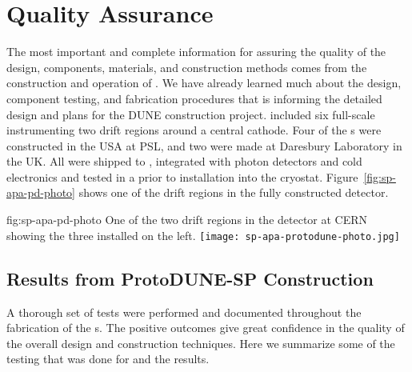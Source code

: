 \section{Quality Assurance}
\label{sec:fdsp-apa-qa}



The most important and complete information for assuring the quality of the  design, components, materials, and construction methods comes from the construction and operation of .  We have already learned much about the design, component testing, and fabrication procedures that is informing the detailed design and plans for the DUNE  construction project.  included six full-scale   instrumenting two drift regions around a central cathode.  Four of the  s were constructed in the USA at %
PSL, and two were made at Daresbury Laboratory in the UK. All were shipped to , integrated with photon detectors and cold electronics and tested in a \coldbox prior to installation into the  cryostat.  Figure~\ref{fig:sp-apa-pd-photo} shows one of the drift regions in the fully constructed  detector.

\begin{dunefigure}{fig:sp-apa-pd-photo}
{One of the two drift regions in the  detector at CERN showing the three installed  on the left.}
\texttt{[image: sp-apa-protodune-photo.jpg]}
\end{dunefigure}


\subsection{Results from ProtoDUNE-SP Construction}
\label{sec:fdsp-apa-qa-protodune-const}


A thorough set of  tests were performed and documented throughout the fabrication of the  s.  The positive outcomes give great confidence in the quality of the overall  design  and construction techniques.  Here we summarize some of the testing that was done for  and the results.   

